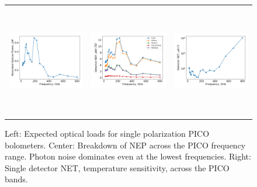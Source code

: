 \documentclass[]{spie}  %
\newcommand{\comr}[1]{\textcolor{red}{#1}}
\begin{document}
\begin{figure} [ht]
\begin{center}
\begin{tabular}{ccc} %
\hspace{-1.4cm} \includegraphics[height=4.9cm]{system_Popt.png} & \hspace{-0.7cm} \includegraphics[height=4.9cm]{system_NEP.png} &\hspace{-0.7cm}  \includegraphics[height=4.9cm]{system_NET.png} 
\end{tabular}
\end{center}
\caption{ \label{fig:popt} \label{fig:noise} \label{fig:net} 
Left: Expected optical loads for single polarization PICO bolometers. 
Center: Breakdown of NEP across the PICO frequency range.  Photon noise dominates even at the lowest frequencies. 
Right: Single detector NET, temperature sensitivity,  across the PICO bands. %
}
\end{figure} 
\end{document}
